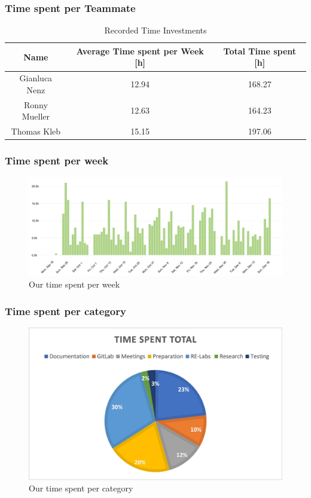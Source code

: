 \subsubsection*{Time spent per Teammate}
\begin{table}[H]
    \centering
    \begin{tabular}{||c c c||} 
        \hline
        Name & Average Time spent per Week [h] & Total Time spent [h]\\ [0.5ex] 
        \hline\hline
        Gianluca Nenz & 12.94 & 168.27 \\ 
        \hline
        Ronny Mueller & 12.63 & 164.23 \\
        \hline
        Thomas Kleb & 15.15 & 197.06 \\ 
        \hline
    \end{tabular}
    \caption{Recorded Time Investments}
    \label{time_ects_recorded}
\end{table}

\subsubsection*{Time spent per week}
\begin{figure}[H]
    \includegraphics[width=\linewidth, center]{resources/time-per-week.png}
    \caption{Our time spent per week}
    \label{fig:timeperweek}
\end{figure}

\subsubsection*{Time spent per category}
\begin{figure}[H]
    \includegraphics[width=\linewidth, center]{resources/time-per-category.png}
    \caption{Our time spent per category}
    \label{fig:timepercategory}
\end{figure}



